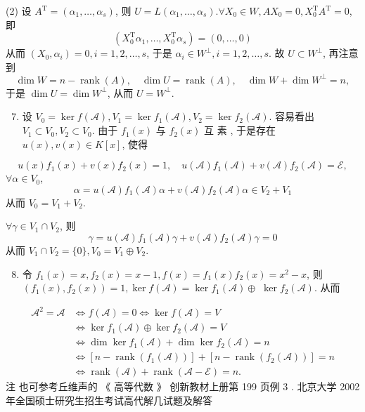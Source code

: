 \documentclass[10pt]{article}
\begin{document}
(2)  设  $A^{\mathrm{T}}=\left(\alpha_{1}, \ldots, \alpha_{s}\right)$,  则  $U=L\left(\alpha_{1}, \ldots, \alpha_{s}\right) . \forall X_{0} \in W, A X_{0}=0, X_{0}^{\mathrm{T}} A^{\mathrm{T}}=0$,  即 
$$
\left(X_{0}^{\mathrm{T}} \alpha_{1}, \ldots, X_{0}^{\mathrm{T}} \alpha_{s}\right)=(0, \ldots, 0)
$$
 从而  $\left(X_{0}, \alpha_{i}\right)=0, i=1,2, \ldots, s$,  于是  $\alpha_{i} \in W^{\perp}, i=1,2, \ldots, s$.  故  $U \subset W^{\perp}$,  再注意到 
$$
\operatorname{dim} W=n-\operatorname{rank}(A), \quad \operatorname{dim} U=\operatorname{rank}(A), \quad \operatorname{dim} W+\operatorname{dim} W^{\perp}=n,
$$
 于是  $\operatorname{dim} U=\operatorname{dim} W^{\perp}$,  从而  $U=W^{\perp}$.

\begin{enumerate}
  \setcounter{enumi}{6}
  \item  设  $V_{0}=\operatorname{ker} f(\mathscr{A}), V_{1}=\operatorname{ker} f_{1}(\mathscr{A}), V_{2}=\operatorname{ker} f_{2}(\mathscr{A})$.  容易看出  $V_{1} \subset V_{0}, V_{2} \subset V_{0}$.  由于  $f_{1}(x)$  与  $f_{2}(x)$  互   素 ,  于是存在  $u(x), v(x) \in K[x]$,  使得 
\end{enumerate}
$$
u(x) f_{1}(x)+v(x) f_{2}(x)=1, \quad u(\mathscr{A}) f_{1}(\mathscr{A})+v(\mathscr{A}) f_{2}(\mathscr{A})=\mathscr{E},
$$
$\forall \alpha \in V_{0}$,
$$
\alpha=u(\mathscr{A}) f_{1}(\mathscr{A}) \alpha+v(\mathscr{A}) f_{2}(\mathscr{A}) \alpha \in V_{2}+V_{1}
$$
 从而  $V_{0}=V_{1}+V_{2}$.

$\forall \gamma \in V_{1} \cap V_{2}$,  则 
$$
\gamma=u(\mathscr{A}) f_{1}(\mathscr{A}) \gamma+v(\mathscr{A}) f_{2}(\mathscr{A}) \gamma=0
$$
 从而  $V_{1} \cap V_{2}=\{0\}, V_{0}=V_{1} \oplus V_{2}$.

\begin{enumerate}
  \setcounter{enumi}{7}
  \item  令  $f_{1}(x)=x, f_{2}(x)=x-1, f(x)=f_{1}(x) f_{2}(x)=x^{2}-x$,  则  $\left(f_{1}(x), f_{2}(x)\right)=1, \operatorname{ker} f(\mathscr{A})=\operatorname{ker} f_{1}(\mathscr{A}) \oplus$ $\operatorname{ker} f_{2}(\mathscr{A})$.  从而 
\end{enumerate}
$$
\begin{aligned}
\mathscr{A}^{2}=\mathscr{A} & \Longleftrightarrow f(\mathscr{A})=0 \Longleftrightarrow \operatorname{ker} f(\mathscr{A})=V \\
& \Longleftrightarrow \operatorname{ker} f_{1}(\mathscr{A}) \oplus \operatorname{ker} f_{2}(\mathscr{A})=V \\
& \Longleftrightarrow \operatorname{dim} \operatorname{ker} f_{1}(\mathscr{A})+\operatorname{dim} \operatorname{ker} f_{2}(\mathscr{A})=n \\
& \Longleftrightarrow\left[n-\operatorname{rank}\left(f_{1}(\mathscr{A})\right)\right]+\left[n-\operatorname{rank}\left(f_{2}(\mathscr{A})\right)\right]=n \\
& \Longleftrightarrow \operatorname{rank}(\mathscr{A})+\operatorname{rank}(\mathscr{A}-\mathscr{E})=n .
\end{aligned}
$$
 注   也可参考丘维声的 《 高等代数 》 创新教材上册第  199  页例  3 .  北京大学  2002  年全国硕士研究生招生考试高代解几试题及解答 
\end{document}
